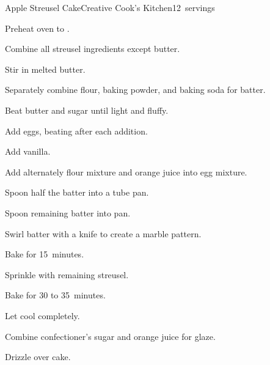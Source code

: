 \begin{recipe}{Apple Streusel Cake}{Creative Cook's Kitchen}{12~servings}
\begin{directions}
\item Preheat oven to .
\item Combine all streusel ingredients except butter.
\item Stir in melted butter.
\item Separately combine flour, baking powder, and baking soda for batter.
\item Beat butter and sugar until light and fluffy.
\item Add eggs, beating after each addition.
\item Add vanilla.
\item Add alternately flour mixture and orange juice into egg mixture.
\item Spoon half the batter into a tube pan.
\item Spoon remaining batter into pan.
\item Swirl batter with a knife to create a marble pattern.
\item Bake for 15~minutes.
\item Sprinkle with remaining streusel.
\item Bake for 30 to 35~minutes.
\item Let cool completely.
\item Combine confectioner's sugar and orange juice for glaze.
\item Drizzle over cake.
\end{directions}

\end{recipe}
